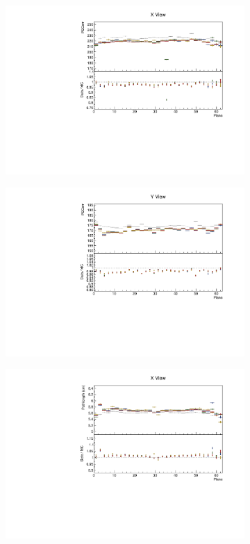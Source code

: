 \documentclass[12pt,a4paper]{article}
\begin{document}
\begin{figure}[h!]
\begin{subfigure}{0.5\textwidth}
  \end{subfigure}
  \begin{subfigure}{0.5\textwidth}
    \includegraphics[width=\linewidth]{essentialsec_tb/pecorr_plane_x.pdf}
  \end{subfigure}
  \begin{subfigure}{0.5\textwidth}
    \includegraphics[width=\linewidth]{essentialsec_tb/pecorr_plane_y.pdf}
  \end{subfigure}
  \begin{subfigure}{0.5\textwidth}
    \includegraphics[width=\linewidth]{essentialsec_tb/cm_plane_x.pdf}

\end{subfigure}
\end{figure}
\end{document}
